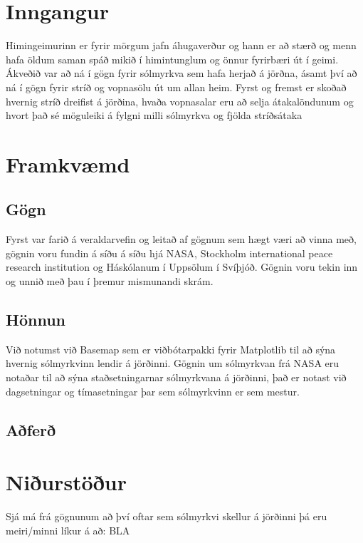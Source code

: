 \documentclass[12pt, git, final]{rureport}
\begin{document}
\maketitle  %


%
\section{Inngangur} %
Himingeimurinn er fyrir mörgum jafn áhugaverður og hann er að stærð og menn hafa öldum saman spáð mikið í himintunglum og önnur fyrirbæri út í geimi. Ákveðið var að ná í gögn fyrir sólmyrkva sem hafa herjað á jörðna, ásamt því að ná í gögn fyrir stríð og vopnasölu út um allan heim. Fyrst og fremst er skoðað hvernig stríð dreifist á jörðina, hvaða vopnasalar eru að selja átakalöndunum og hvort það sé möguleiki á fylgni milli sólmyrkva og fjölda stríðsátaka
\section{Framkvæmd}
\subsection{Gögn}
Fyrst var farið á veraldarvefin og leitað af gögnum sem hægt væri að vinna með, gögnin voru fundin á síðu á síðu hjá NASA, Stockholm international peace research institution og Háskólanum í Uppsölum í Svíþjóð. Gögnin voru tekin inn og unnið með þau í þremur mismunandi skrám.
\subsection{Hönnun}
Við notumst við Basemap sem er viðbótarpakki fyrir Matplotlib til að sýna hvernig sólmyrkvinn lendir á jörðinni. Gögnin um sólmyrkvan frá NASA eru notaðar til að sýna staðsetningarnar sólmyrkvana á jörðinni, það er notast við dagsetningar og tímasetningar þar sem sólmyrkvinn er sem mestur. 
\subsection{Aðferð}
%
\section{Niðurstöður}\label{nidurstodur}
Sjá má frá gögnunum að því oftar sem sólmyrkvi skellur á  jörðinni þá eru meiri/minni líkur á að: BLA

\pagebreak


\clearpage
\printbibliography
\end{document}
